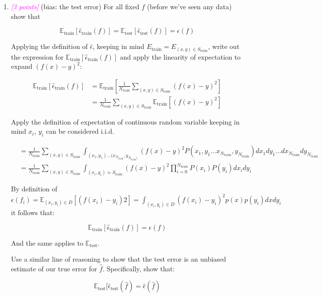 \documentclass{article}
\newcommand{\1}{\mathbf{1}}
\newcommand{\E}{\mathbb{E}}
\newcommand{\points}[1]{\small\textcolor{magenta}{\emph{[#1 points]}} \normalsize}
\begin{document}
\begin{enumerate}
    \item \points{3} (bias: the test error) For all fixed $f$ (before we’ve seen any data) show that 
    
    $$\E_{\text{train}}[\widehat\epsilon_{\text{train}}(f)] = \E_\text{test}[\widehat\epsilon_\text{test}(f)]=\epsilon(f)$$
    
    Applying the definition of $\hat \epsilon $, keeping in mind $E_\text{train} = E_{(x,y)\in S_\text{train}}$, write out the expression for $\E_{\text{train}}[\widehat\epsilon_{\text{train}}(f)]$ and apply the linearity of expectation to expand $(f(x)-y)^2$:
    
    \begin{align*}
        \E_\text{train} [\widehat\epsilon_\text{train}(f)] &= \E_\text{train}\left[\frac{1}{N_\text{train}} \sum_{(x,y)\in S_\text{train}} (f(x)-y)^2 \right] \\
        &= \frac{1}{N_\text{train}} \sum_{(x,y)\in S_\text{train}} \E_\text{train}\left[ (f(x)-y)^2 \right] 
    \end{align*}{}
    
    Apply the definition of expectation of continuous random variable keeping in mind $x_i$, $y_i$ can be considered i.i.d. 
    
    \begin{align*}
     &= \frac{1}{N_\text{train}} \sum_{(x,y)\in S_\text{train}} \int_{(x_1,y_1)\hdots (x_{N_\text{train}},y_{N_\text{train})}} (f(x)-y)^2 P(x_1, y_1 \hdots x_{N_\text{train}},y_{N_\text{train}}) dx_1dy_1\hdots dx_{N_\text{train}} dy_{N_\text{train}} \\    
     &= \frac{1}{N_\text{train}} \sum_{(x,y)\in S_\text{train}} \int_{(x_i,y_i)\approx S_\text{train}} (f(x)-y)^2  \prod_{i=0}^{N_\text{train}} P(x_i)P(y_i) dx_idy_i
    \end{align*}{}
    
    By definition of $\epsilon(f_i) = \E_{(x_i,y_i)\in D}[(f(x_i)-y_i)2] = \int_{(x_i,y_i)\in D} (f(x_i)-y_i)^2p(x)p(y_i)dxdy_i$ it follows that:
    
    $$\E_\text{train} [\widehat\epsilon_\text{train}(f)] = \epsilon(f)$$
    
    And the same applies to $\E_\text{test}$.

    Use a similar line of reasoning to show that the test error is an unbiased estimate of our true error for $\hat f$. Specifically, show that: 
    
    $$\E_\text{test}[\widehat\epsilon_\text{test}(\hat f) = \widehat\epsilon(\hat f)$$
    

\end{enumerate}
\end{document}
